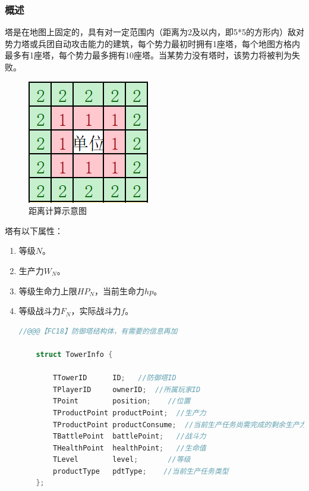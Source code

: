 \documentclass[a4paper,4pt]{article}
\begin{document}
\subsubsection{概述}
塔是在地图上固定的，具有对一定范围内（距离为2及以内，即5*5的方形内）敌对势力塔或兵团自动攻击能力的建筑，每个势力最初时拥有1座塔，每个地图方格内最多有1座塔，每个势力最多拥有10座塔。当某势力没有塔时，该势力将被判为失败。
\begin{figure}[htbp]   %
	\centering
	\includegraphics[width=1.5 in]{距离.jpg.png}
	\caption{距离计算示意图}
	\label{jpg:示例图片2}
\end{figure}
塔有以下属性：
\begin{enumerate}[fullwidth, itemindent=2em, label=(\arabic*)]
	\item 等级$N$。
	\item 生产力$W_N$。
	\item 等级生命力上限$HP_N$，当前生命力$hp$。
	\item 等级战斗力$F_N$，实际战斗力$f$。%
	      \begin{lstlisting}[language={C++},title={防御塔结构体}]  %插入代码块
  	//@@@【FC18】防御塔结构体，有需要的信息再加
  	
  	struct TowerInfo {
  		
  		TTowerID      ID;   //防御塔ID
  		TPlayerID     ownerID;  //所属玩家ID
  		TPoint        position;    //位置
  		TProductPoint productPoint;  //生产力
  		TProductPoint productConsume;  //当前生产任务尚需完成的剩余生产力值
  		TBattlePoint  battlePoint;   //战斗力
  		THealthPoint  healthPoint;   //生命值
  		TLevel        level;       //等级
  		productType   pdtType;    //当前生产任务类型
  	};
  \end{lstlisting}

\end{enumerate}
\end{document}
